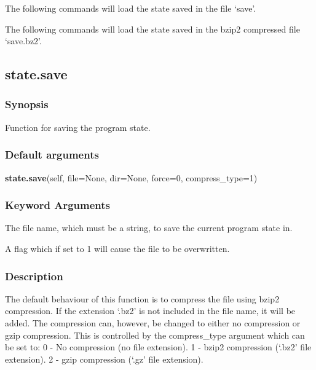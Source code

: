 The following commands will load the state saved in the file `save'.



The following commands will load the state saved in the bzip2 compressed file `save.bz2'.





\newpage

\subsection{state.save}


\subsubsection{Synopsis}

Function for saving the program state.

\subsubsection{Default arguments}

\textsf{\textbf{state.save}(self, file=None, dir=None, force=0, compress\_type=1)}


\subsubsection{Keyword Arguments}

  The file name, which must be a string, to save the current program state in.

  A flag which if set to 1 will cause the file to be overwritten.

\subsubsection{Description}

The default behaviour of this function is to compress the file using bzip2 compression.  If
the extension `.bz2' is not included in the file name, it will be added.  The compression
can, however, be changed to either no compression or gzip compression.  This is controlled
by the compress\_type argument which can be set to:
    0 - No compression (no file extension).
    1 - bzip2 compression (`.bz2' file extension).
    2 - gzip compression (`.gz' file extension).



